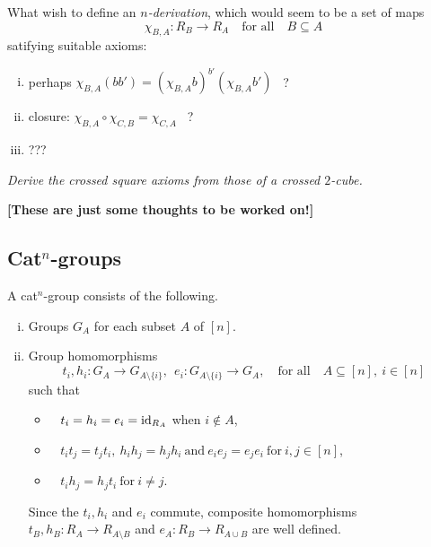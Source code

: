 \bigskip
What wish to define an \emph{$n$-derivation}, 
which would seem to be a set of maps
$$
\chi_{B,A} : R_B \to R_A  \quad\mbox{for all}\quad  B \subseteq A
$$
satifying suitable axioms:
\begin{enumerate}[(i)]
\item
perhaps  \qquad 
$\chi_{B,A}(bb') = (\chi_{B,A} b)^{b'} (\chi_{B,A} b')$ ~?
\item
closure: \qquad
$\chi_{B,A} \circ \chi_{C,B} = \chi_{C,A}$ ~?
\item ???
\end{enumerate}

\begin{exercise}
\emph{Derive the crossed square axioms 
from those of a crossed $2$-cube.}
\end{exercise}


\bigskip\noindent
{\bf [These are just some thoughts to be worked on!]}


\subsection{Cat$^n$-groups}   

A cat$^n$-group consists of the following.
\begin{enumerate}[(i)]
\item
Groups  $G_A$  for each subset  $A$  of  $[n]$. 

\item
Group homomorphisms
$$
t_i, h_i : G_A \to G_{A \setminus \{i\}}, ~~
e_i : G_{A \setminus \{i\}} \to G_A,
\quad\mbox{for all} \quad 
A \subseteq [n],~ i \in [n]
$$
such that
\begin{itemize}
\item~  
$t_i = h_i = e_i = \mathrm{id}_{R_A}$  when  $i \notin A$,
\item~ 
$t_i t_j = t_j t_i,~
 h_i h_j = h_j h_i ~\mbox{and}~
 e_i e_j = e_j e_i ~\mbox{for}~ i,j \in [n]$,
\item~
$t_i h_j = h_j t_i ~\mbox{for}~ i \neq j$.
\end{itemize}

\noindent
Since the $t_i, h_i$ and $e_i$ commute, composite homomorphisms
$t_B, h_B : R_A \to R_{A \setminus B}$ and 
$e_A : R_B \to R_{A \cup B}$ 
are well defined.
\end{enumerate}



